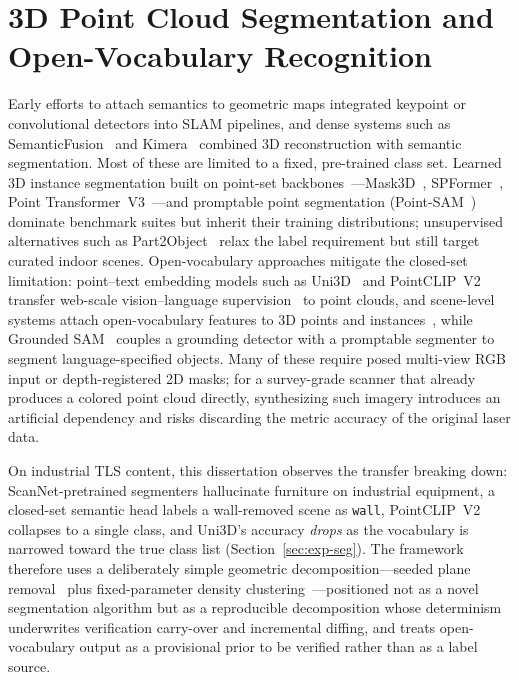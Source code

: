 \section{3D Point Cloud Segmentation and Open-Vocabulary Recognition}
\label{sec:rw-segmentation}

Early efforts to attach semantics to geometric maps integrated keypoint or
convolutional detectors into SLAM pipelines, and dense systems such as
SemanticFusion~\cite{mccormac2017semanticfusion} and
Kimera~\cite{rosinol2020kimera} combined 3D reconstruction with semantic
segmentation. Most of these are limited to a fixed, pre-trained class set.
Learned 3D instance segmentation built on point-set
backbones~\cite{qi2017pointnet,qi2017pointnetpp}---Mask3D~\cite{schult2023mask3d},
SPFormer~\cite{sun2023spformer}, Point Transformer~V3~\cite{wu2024ptv3}---and
promptable point segmentation (Point-SAM~\cite{zhou2024pointsam}) dominate
benchmark suites but inherit their training distributions; unsupervised
alternatives such as Part2Object~\cite{shi2024part2object} relax the label
requirement but still target curated indoor scenes. Open-vocabulary approaches
mitigate the closed-set limitation: point--text embedding models such as
Uni3D~\cite{zhou2024uni3d} and PointCLIP~V2~\cite{zhu2023pointclipv2} transfer
web-scale vision--language supervision~\cite{radford2021clip} to point clouds,
and scene-level systems attach open-vocabulary features to 3D points and
instances~\cite{peng2023openscene,takmaz2023openmask3d,nguyen2024open3dis},
while Grounded SAM~\cite{ren2024} couples a grounding detector with a
promptable segmenter to segment language-specified objects. Many of these
require posed multi-view RGB input or depth-registered 2D masks; for a
survey-grade scanner that already produces a colored point cloud directly,
synthesizing such imagery introduces an artificial dependency and risks
discarding the metric accuracy of the original laser data.

On industrial TLS content, this dissertation observes the transfer breaking
down: ScanNet-pretrained segmenters hallucinate furniture on industrial
equipment, a closed-set semantic head labels a wall-removed scene as
\texttt{wall}, PointCLIP~V2 collapses to a single class, and Uni3D's accuracy
\emph{drops} as the vocabulary is narrowed toward the true class list
(Section~\ref{sec:exp-seg}). The framework therefore uses a deliberately simple
geometric decomposition---seeded plane
removal~\cite{fischler1981ransac,schnabel2007efficient} plus fixed-parameter
density clustering~\cite{ester1996dbscan}---positioned not as a novel
segmentation algorithm but as a reproducible decomposition whose determinism
underwrites verification carry-over and incremental diffing, and treats
open-vocabulary output as a provisional prior to be verified rather than as a
label source.

